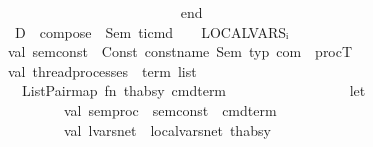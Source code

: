 \begin{isabellebody}
\ \ \ \ \ \ \ \ \ \ \ \ \ \ \ \ \ \ {\isacharasterisk}{\kern0pt}{\isacharparenright}{\kern0pt}\isanewline
\isanewline
\ \ \ \ \ \ \ \ \ \ \ \ \ \ \ \ end\isanewline
\ \ \ \ \ \ \ \ \ \ \ \ \isanewline
\ \ \ \ \ \ \ \ \ \ \isanewline
\ \ \ \ \ \ \ \ \ \ {\isacharparenleft}{\kern0pt}{\isacharasterisk}{\kern0pt}\ D{\isachardot}{\kern0pt}\ \ compose\ \ Sem\ ti{\isacharunderscore}{\kern0pt}cmd\ \ {\isacharbar}{\kern0pt}{\isacharbar}{\kern0pt}\ \ LOCALVARSᵢ\ \ {\isacharminus}{\kern0pt}{\isacharminus}{\kern0pt}{\isacharminus}{\kern0pt}{\isacharminus}{\kern0pt}{\isacharminus}{\kern0pt}{\isacharminus}{\kern0pt}{\isacharminus}{\kern0pt}{\isacharminus}{\kern0pt}{\isacharminus}{\kern0pt}{\isacharminus}{\kern0pt}{\isacharminus}{\kern0pt}{\isacharminus}{\kern0pt}{\isacharminus}{\kern0pt}{\isacharminus}{\kern0pt}{\isacharminus}{\kern0pt}{\isacharminus}{\kern0pt}{\isacharminus}{\kern0pt}{\isacharminus}{\kern0pt}{\isacharminus}{\kern0pt}{\isacharminus}{\kern0pt}{\isacharminus}{\kern0pt}{\isacharminus}{\kern0pt}{\isacharminus}{\kern0pt}{\isacharminus}{\kern0pt}{\isacharminus}{\kern0pt}{\isacharminus}{\kern0pt}{\isacharminus}{\kern0pt}{\isacharminus}{\kern0pt}\ {\isacharasterisk}{\kern0pt}{\isacharparenright}{\kern0pt}\isanewline
\ \ \ \ \ \ \ \ \ \isanewline
\ \ \ \ \ \ \ \ \ \ val\ sem{\isacharunderscore}{\kern0pt}const\ {\isacharequal}{\kern0pt}\ Const\ {\isacharparenleft}{\kern0pt}{\isacharat}{\kern0pt}{\isacharbraceleft}{\kern0pt}const{\isacharunderscore}{\kern0pt}name\ Sem{\isacharbraceright}{\kern0pt}{\isacharcomma}{\kern0pt}\ {\isacharat}{\kern0pt}{\isacharbraceleft}{\kern0pt}typ\ com{\isacharbraceright}{\kern0pt}\ {\isacharminus}{\kern0pt}{\isacharminus}{\kern0pt}{\isachargreater}{\kern0pt}\ procT{\isacharparenright}{\kern0pt}\isanewline
\ \ \ \ \ \ \ \ \ \ val\ thread{\isacharunderscore}{\kern0pt}processes\ {\isacharcolon}{\kern0pt}\ term\ list\ {\isacharequal}{\kern0pt}\isanewline
\ \ \ \ \ \ \ \ \ \ \ \ ListPair{\isachardot}{\kern0pt}map\ {\isacharparenleft}{\kern0pt}fn\ {\isacharparenleft}{\kern0pt}th{\isacharunderscore}{\kern0pt}absy{\isacharcomma}{\kern0pt}\ cmd{\isacharunderscore}{\kern0pt}term{\isacharparenright}{\kern0pt}\ {\isacharequal}{\kern0pt}{\isachargreater}{\kern0pt}\isanewline
\ \ \ \ \ \ \ \ \ \ \ \ \ \ \ \ let\isanewline
\ \ \ \ \ \ \ \ \ \ \ \ \ \ \ \ \ \ val\ sem{\isacharunderscore}{\kern0pt}proc\ {\isacharequal}{\kern0pt}\ sem{\isacharunderscore}{\kern0pt}const\ {\isachardollar}{\kern0pt}\ cmd{\isacharunderscore}{\kern0pt}term\isanewline
\ \ \ \ \ \ \ \ \ \ \ \ \ \ \ \ \ \ val\ lvars{\isacharunderscore}{\kern0pt}net\ {\isacharequal}{\kern0pt}\ localvars{\isacharunderscore}{\kern0pt}net\ th{\isacharunderscore}{\kern0pt}absy\ \isanewline

\end{isabellebody}
